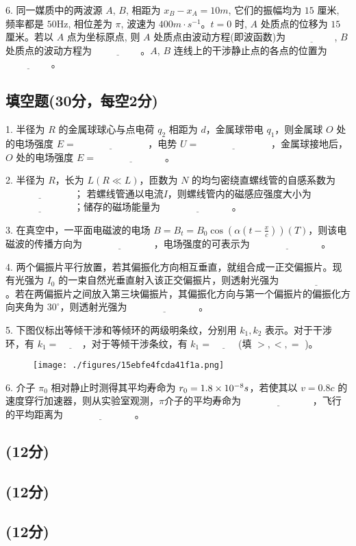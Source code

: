 6. 同一媒质中的两波源 $A$, $B$, 相距为 $x_B - x_A = 10m$, 它们的振幅均为 $15$ 厘米, 频率都是 $50$Hz, 相位差为 $\pi$, 波速为 $400m\cdot s^{-1}$。$t = 0$ 时, $A$ 处质点的位移为 $15$ 厘米。若以 $A$ 点为坐标原点, 则 $A$ 处质点由波动方程(即波函数)为 $\underline{\hspace{2cm}}$, $B$ 处质点的波动方程为 $\underline{\hspace{2cm}}$。$A$, $B$ 连线上的干涉静止点的各点的位置为 $\underline{\hspace{2cm}}$。
\subsection{填空题(30分，每空2分)}
1. 半径为 $R$ 的金属球球心与点电荷 $q_2$ 相距为 $d$，金属球带电 $q_1$，则金属球 $O$ 处的电场强度 $E= \underline{\hspace{3cm}}$ ，电势 $U= \underline{\hspace{3cm}}$ ，金属球接地后，$O$ 处的电场强度 $E= \underline{\hspace{3cm}}$。

  2. 半径为 $R$，长为 $L (R \ll L)$，匝数为 $N$ 的均匀密绕直螺线管的自感系数为 $\underline{\hspace{3cm}}$； 若螺线管通以电流$I$，则螺线管内的磁感应强度大小为 $\underline{\hspace{3cm}}$；储存的磁场能量为 $\underline{\hspace{3cm}}$。

  3. 在真空中，一平面电磁波的电场 $B=B_t=B_0 \cos(\alpha (t - \frac{x}{c})) (T)$，则该电磁波的传播方向为 $\underline{\hspace{3cm}}$，电场强度的可表示为 $\underline{\hspace{3cm}}$。

  4. 两个偏振片平行放置，若其偏振化方向相互垂直，就组合成一正交偏振片。现有光强为 $I_0$ 的一束自然光垂直射入该正交偏振片，则透射光强为 $\underline{\hspace{3cm}}$。若在两偏振片之间放入第三块偏振片，其偏振化方向与第一个偏振片的偏振化方向夹角为 $30^\circ$，则透射光强为 $\underline{\hspace{3cm}}$。

  5. 下图仪标出等倾干涉和等倾环的两级明条纹，分别用 $k_1, k_2$ 表示。对于干涉环，有 $k_1 = \underline{\hspace{1cm}}$，对于等倾干涉条纹，有 $k_1 = \underline{\hspace{1cm}}$ (填 $>, <, =$ )。
\begin{figure}[ht]
\centering
\texttt{[image: ./figures/15ebfe4fcda41f1a.png]}
\caption{} \label{fig_NJU07_3}
\end{figure}
6. 介子 $\pi_0$ 相对静止时测得其平均寿命为 $r_0=1.8 \times 10^{-8} \\ s$，若使其以 $v = 0.8c$ 的速度穿行加速器，则从实验室观测，$\pi$介子的平均寿命为 $\underline{\hspace{3cm}}$，飞行的平均距离为 $\underline{\hspace{3cm}}$。
\subsection{(12分)}

\subsection{(12分)}

\subsection{(12分)}